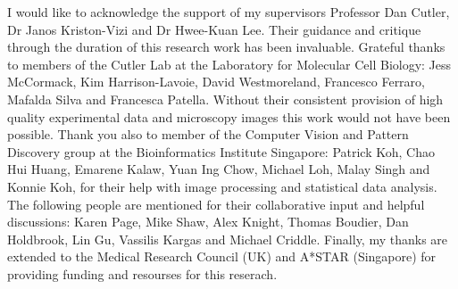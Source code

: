 \begin{acknowledgements}
I would like to acknowledge the support of my supervisors Professor Dan Cutler, Dr Janos Kriston-Vizi and Dr Hwee-Kuan Lee. Their guidance and critique through the duration of this research work has been invaluable. Grateful thanks to members of the Cutler Lab at the Laboratory for Molecular Cell Biology: Jess McCormack, Kim Harrison-Lavoie, David Westmoreland, Francesco Ferraro, Mafalda Silva and Francesca Patella. Without their consistent provision of high quality experimental data and microscopy images this work would not have been possible. Thank you also to member of the Computer Vision and Pattern Discovery group at the Bioinformatics Institute Singapore: Patrick Koh, Chao Hui Huang, Emarene Kalaw, Yuan Ing Chow, Michael Loh, Malay Singh and Konnie Koh, for their help with image processing and statistical data analysis. The following people are mentioned for their collaborative input and helpful discussions: Karen Page, Mike Shaw, Alex Knight, Thomas Boudier, Dan Holdbrook, Lin Gu, Vassilis Kargas and Michael Criddle. Finally, my thanks are extended to the Medical Research Council (UK) and A*STAR (Singapore) for providing funding and resourses for this reserach.
\end{acknowledgements}
